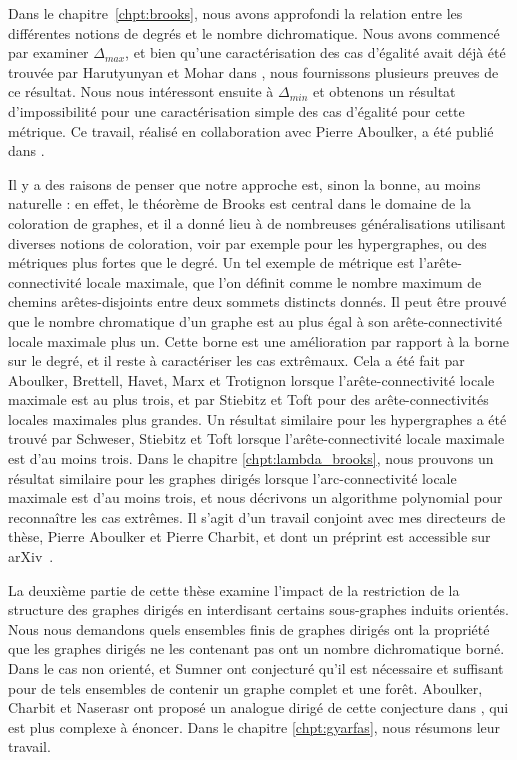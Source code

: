 Dans le chapitre~\ref{chpt:brooks}, nous avons approfondi la relation entre les différentes notions de degrés et le nombre dichromatique. Nous avons commencé par examiner $\Delta_{max}$, et bien qu'une caractérisation des cas d'égalité avait déjà été trouvée par Harutyunyan et Mohar dans \cite{HMGallai}, nous fournissons plusieurs preuves de ce résultat. Nous nous intéressont ensuite à $\Delta_{min}$ et obtenons un résultat d'impossibilité pour une caractérisation simple des cas d'égalité pour cette métrique. Ce travail, réalisé en collaboration avec Pierre Aboulker, a été publié dans \cite{AA22}.

\medskip
Il y a des raisons de penser que notre approche est, sinon la bonne, au moins naturelle : en effet, le théorème de Brooks est central dans le domaine de la coloration de graphes, et il a donné lieu à de nombreuses généralisations utilisant diverses notions de coloration, voir par exemple \cite{RPJ75} pour les hypergraphes, ou des métriques plus fortes que le degré. Un tel exemple de métrique est l'arête-connectivité locale maximale, que l'on définit comme le nombre maximum de chemins arêtes-disjoints entre deux sommets distincts donnés. Il peut être prouvé que le nombre chromatique d'un graphe est au plus égal à son arête-connectivité locale maximale plus un. Cette borne est une amélioration par rapport à la borne sur le degré, et il reste à caractériser les cas extrêmaux. Cela a été fait par Aboulker, Brettell, Havet, Marx et Trotignon \cite{ABHMT17} lorsque l'arête-connectivité locale maximale est au plus trois, et par Stiebitz et Toft \cite{ST16} pour des arête-connectivités locales maximales plus grandes. Un résultat similaire pour les hypergraphes a été trouvé par Schweser, Stiebitz et Toft \cite{SST22} lorsque l'arête-connectivité locale maximale est d'au moins trois. Dans le chapitre \ref{chpt:lambda_brooks}, nous prouvons un résultat similaire pour les graphes dirigés lorsque l'arc-connectivité locale maximale est d'au moins trois, et nous décrivons un algorithme polynomial pour reconnaître les cas extrêmes. Il s'agit d'un travail conjoint avec mes directeurs de thèse, Pierre Aboulker et Pierre Charbit, et dont un préprint est accessible sur arXiv~\cite{AAC23}.

\bigskip
La deuxième partie de cette thèse examine l'impact de la restriction de la structure des graphes dirigés en interdisant certains sous-graphes induits orientés. Nous nous demandons quels ensembles finis de graphes dirigés ont la propriété que les graphes dirigés ne les contenant pas ont un nombre dichromatique borné. Dans le cas non orienté, \Gya et Sumner ont conjecturé qu'il est nécessaire et suffisant pour de tels ensembles de contenir un graphe complet et une forêt. Aboulker, Charbit et Naserasr ont proposé un analogue dirigé de cette conjecture dans \cite{ACN21}, qui est plus complexe à énoncer. Dans le chapitre \ref{chpt:gyarfas}, nous résumons leur travail.


